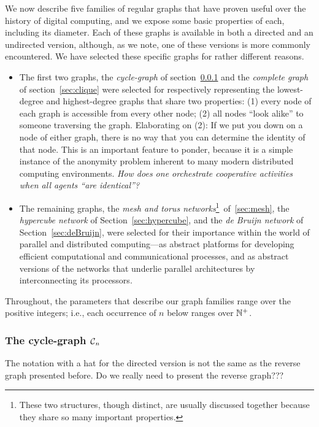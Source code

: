 We now describe five families of regular graphs that have proven
useful over the history of digital computing, and we expose some basic
properties of each, including its diameter.  Each of these graphs is
available in both a directed and an undirected version, although, as
we note, one of these versions is more commonly encountered.  We have
selected these specific graphs for rather different reasons.
\begin{itemize}
\item
The first two graphs, the {\it cycle-graph} of section~\ref{sec:cycle}
and the {\it complete graph} of section~\ref{sec:clique} were selected
for respectively representing the lowest-degree and highest-degree
graphs that share two properties: (1) every node of each graph is
accessible from every other node; (2) all nodes ``look alike'' to
someone traversing the graph.  Elaborating on (2): If we put you down
on a node of either graph, there is no way that you can determine the
identity of that node.  This is an important feature to ponder,
because it is a simple instance of the anonymity problem inherent to
many modern distributed computing environments.  {\it How does one
  orchestrate cooperative activities when all agents ``are
  identical''?}
\item
The remaining graphs, the {\it mesh and torus networks}\footnote{These
  two structures, though distinct, are usually discussed together
  because they share so many important properties.}~of~\ref{sec:mesh},
the {\it hypercube network} of Section~\ref{sec:hypercube}, and the
{\it de Bruijn network} of Section~\ref{sec:deBruijn}, were selected
for their importance within the world of parallel and distributed
computing---as abstract platforms for developing efficient
computational and communicational processes, and as abstract versions
of the networks that underlie parallel architectures by
interconnecting its processors.
\end{itemize}
Throughout, the parameters that describe our graph families range over
the positive integers; i.e., each occurrence of $n$ below ranges over
$\mathbb{N}^+$.

\subsubsection{The cycle-graph $\mbox{$\cal C$}_n$}
\label{sec:cycle}

{\Denis The notation with a hat for the directed version is not the same as
the reverse graph presented before. Do we really need to present the reverse graph???}

